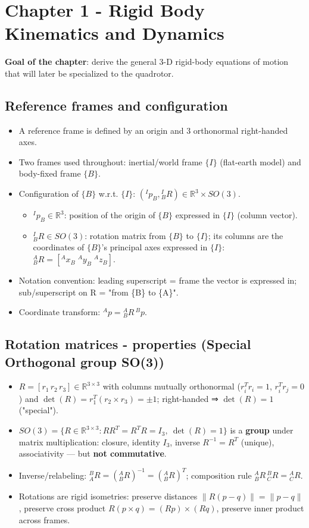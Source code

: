 \documentclass[11pt]{article}
\begin{document}
\section{Chapter 1 - Rigid Body Kinematics and Dynamics}

\textbf{Goal of the chapter}: derive the general 3-D rigid-body equations of motion that will later be specialized to the quadrotor.

\subsection{Reference frames and configuration}
\begin{itemize}
\item A reference frame is defined by an origin and 3 orthonormal right-handed axes.
\item Two frames used throughout: inertial/world frame $\{I\}$ (flat-earth model) and body-fixed frame $\{B\}$.
\item Configuration of $\{B\}$ w.r.t. $\{I\}$: $({}^I p_B, {}^I_B R) \in \mathbb{R}^3 \times SO(3)$.
\begin{itemize}
\item ${}^I p_B \in \mathbb{R}^3$: position of the origin of $\{B\}$ expressed in $\{I\}$ (column vector).
\item ${}^I_B R \in SO(3)$: rotation matrix from $\{B\}$ to $\{I\}$; its columns are the coordinates of $\{B\}$'s principal axes expressed in $\{I\}$: ${}^A_B R = [{}^A x_B \; {}^A y_B \; {}^A z_B]$.
\end{itemize}
\item Notation convention: leading superscript = frame the vector is expressed in; sub/superscript on R = "from \{B\} to \{A\}".
\item Coordinate transform: ${}^A p = {}^A_B R \, {}^B p$.
\end{itemize}

\subsection{Rotation matrices - properties (Special Orthogonal group SO(3))}
\begin{itemize}
\item $R=[r_1\,r_2\,r_3]\in\mathbb{R}^{3\times3}$ with columns mutually orthonormal ($r_i^Tr_i=1$, $r_i^Tr_j=0$) and $\det(R)=r_1^T(r_2\times r_3)=\pm1$; right-handed ⇒ $\det(R)=1$ ("special").
\item $SO(3) = \{R\in\mathbb{R}^{3\times3} : RR^T=R^TR=I_3,\ \det(R)=1\}$ is a \textbf{group} under matrix multiplication: closure, identity $I_3$, inverse $R^{-1}=R^T$ (unique), associativity — but \textbf{not commutative}.
\item Inverse/relabeling: ${}^B_AR=({}^A_BR)^{-1}=({}^A_BR)^T$; composition rule ${}^A_BR\,{}^B_CR={}^A_CR$.
\item Rotations are rigid isometries: preserve distances $\|R(p-q)\|=\|p-q\|$, preserve cross product $R(p\times q)=(Rp)\times(Rq)$, preserve inner product across frames.
\end{itemize}
\end{document}

